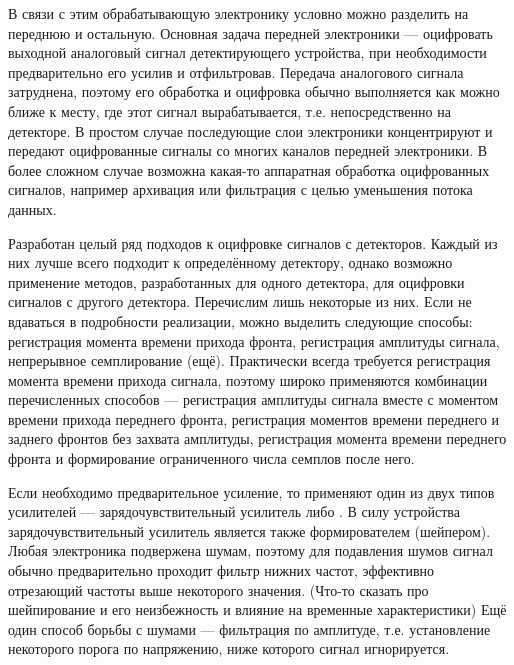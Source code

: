 В связи с этим обрабатывающую электронику условно можно разделить на переднюю и остальную. Основная задача передней электроники --- оцифровать выходной аналоговый сигнал детектирующего устройства, при необходимости предварительно его усилив и отфильтровав. Передача аналогового сигнала затруднена, поэтому его обработка и оцифровка обычно выполняется как можно ближе к месту, где этот сигнал вырабатывается, т.е. непосредственно на детекторе. В простом случае последующие слои электроники концентрируют и передают оцифрованные сигналы со многих каналов передней электроники. В более сложном случае возможна какая-то аппаратная обработка оцифрованных сигналов, например архивация или фильтрация с целью уменьшения потока данных.

Разработан целый ряд подходов к оцифровке сигналов с детекторов. Каждый из них лучше всего подходит к определённому детектору, однако возможно применение методов, разработанных для одного детектора, для оцифровки сигналов с другого детектора. Перечислим лишь некоторые из них. Если не вдаваться в подробности реализации, можно выделить следующие способы: регистрация момента времени прихода фронта, регистрация амплитуды сигнала, непрерывное семплирование (ещё\todo). Практически всегда требуется регистрация момента времени прихода сигнала, поэтому широко применяются комбинации перечисленных способов --- регистрация амплитуды сигнала вместе с моментом времени прихода переднего фронта, регистрация моментов времени переднего и заднего фронтов без захвата амплитуды, регистрация момента времени переднего фронта и формирование ограниченного числа семплов после него.

Если необходимо предварительное усиление, то применяют один из двух типов усилителей --- зарядочувствительный усилитель либо \todo. В силу устройства зарядочувствительный усилитель является также формирователем (шейпером). Любая электроника подвержена шумам, поэтому для подавления шумов сигнал обычно предварительно проходит фильтр нижних частот, эффективно отрезающий частоты выше некоторого значения. (Что-то сказать про шейпирование и его неизбежность и влияние на временные характеристики) Ещё один способ борьбы с шумами --- фильтрация по амплитуде, т.е. установление некоторого порога по напряжению, ниже которого сигнал игнорируется. 

